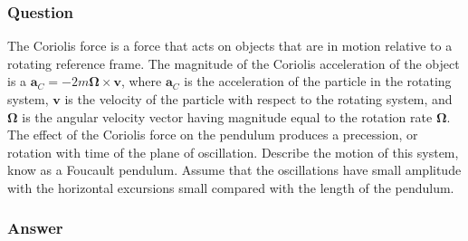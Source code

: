 \subsubsection{Question}
The Coriolis force is a force that acts on objects that are in motion relative to a rotating reference frame. The magnitude of the Coriolis acceleration of the object is a $\boldsymbol{a}_C = -2m\boldsymbol{\Omega}\times\boldsymbol{v}$, where $\boldsymbol{a}_C$ is the acceleration of the particle in the rotating system, $\boldsymbol{v}$ is the velocity of the particle with respect to the rotating system, and $\boldsymbol{\Omega}$ is the angular velocity vector having magnitude equal to the rotation rate $\boldsymbol{\Omega}$. The effect of the Coriolis force on the pendulum produces a precession, or rotation with time of the plane of oscillation. Describe the motion of this system, know as a Foucault pendulum. Assume that the oscillations have small amplitude with the horizontal excursions small compared with the length of the pendulum.
\subsubsection{Answer}


